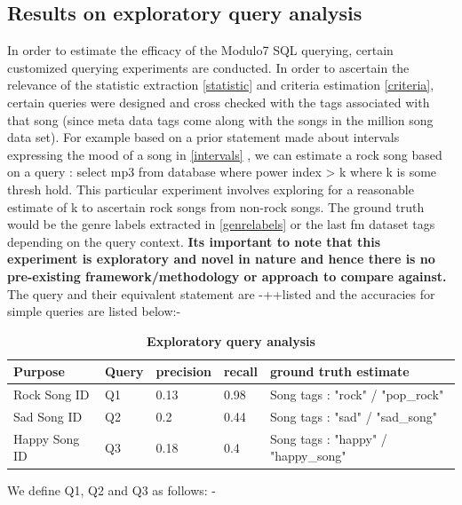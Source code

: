 \subsection{Results on exploratory query analysis}

\noindent In order to estimate the efficacy of the Modulo7 SQL querying, certain customized querying experiments are conducted. In order to ascertain the relevance of the statistic extraction \ref{statistic} and criteria estimation \ref{criteria}, certain queries were designed and cross checked with the tags associated with that song (since meta data tags come along with the songs in the million song data set). For example based on a prior statement made about intervals expressing the mood of a song in \ref{intervals} , we can estimate a rock song based on a query : select mp3 from database where power index > k where k is some thresh hold. This particular experiment involves exploring for a reasonable estimate of k to ascertain rock songs from non-rock songs. The ground truth would be the genre labels extracted in \ref{genrelabels} or the last fm dataset tags \cite{msd} depending on the query context. \textbf{Its important to note that this experiment is exploratory and novel in nature and hence there is no pre-existing framework/methodology or approach to compare against.}\\

\noindent The query and their equivalent statement are -++listed and the accuracies for simple queries are listed below:- \\

\begin{table}[h]
\begin{center}
    \begin{tabular}{| l | l | l | l | l |}
    \hline
    Purpose &  Query & precision  & recall & ground truth estimate \\ \hline
    Rock Song ID &  Q1 & 0.13  & 0.98 & Song tags : "rock" / "pop\_rock" \\ \hline
    Sad Song ID &  Q2 & 0.2  & 0.44 & Song tags : "sad" / "sad\_song" \\ \hline
    Happy Song ID &  Q3 & 0.18  & 0.4 & Song tags : "happy" / "happy\_song" \\
    \hline
    \end{tabular}
\end{center}
\caption{\textbf{Exploratory query analysis}}
\end{table}

We define Q1, Q2 and Q3 as follows: -


